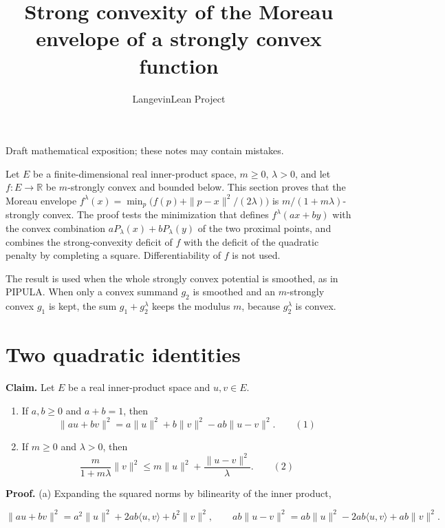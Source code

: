 \documentclass[11pt,a4paper]{article}
\title{\texorpdfstring{Strong convexity of the Moreau envelope of a strongly convex function}{Strong convexity of the Moreau envelope of a strongly convex function}}
\author{LangevinLean Project}
\date{}
\begin{document}
\maketitle
Draft mathematical exposition; these notes may contain mistakes.


Let \(E\) be a finite-dimensional real inner-product space, \(m\ge0\), \(\lambda>0\), and let \(f:E\to\mathbb R\) be \(m\)-strongly convex and bounded below. This section proves that the Moreau envelope \(f^\lambda(x)=\min_p\bigl(f(p)+\|p-x\|^2/(2\lambda)\bigr)\) is \(m/(1+m\lambda)\)-strongly convex. The proof tests the minimization that defines \(f^\lambda(ax+by)\) with the convex combination \(aP_\lambda(x)+bP_\lambda(y)\) of the two proximal points, and combines the strong-convexity deficit of \(f\) with the deficit of the quadratic penalty by completing a square. Differentiability of \(f\) is not used.




The result is used when the whole strongly convex potential is smoothed, as in PIPULA. When only a convex summand \(g_2\) is smoothed and an \(m\)-strongly convex \(g_1\) is kept, the sum \(g_1+g_2^\lambda\) keeps the modulus \(m\), because \(g_2^\lambda\) is convex.


\section{\texorpdfstring{Two quadratic identities}{Two quadratic identities}}


\textbf{Claim.} Let \(E\) be a real inner-product space and \(u,v\in E\).



\begin{enumerate}


\item If \(a,b\ge0\) and \(a+b=1\), then
\[\|au+bv\|^2=a\|u\|^2+b\|v\|^2-ab\|u-v\|^2.\qquad(1)\]

\item If \(m\ge0\) and \(\lambda>0\), then
\[\frac{m}{1+m\lambda}\|v\|^2\le m\|u\|^2+\frac{\|u-v\|^2}{\lambda}.\qquad(2)\]

\end{enumerate}



\textbf{Proof.} (a) Expanding the squared norms by bilinearity of the inner product,


\[\|au+bv\|^2=a^2\|u\|^2+2ab\langle u,v\rangle+b^2\|v\|^2,\qquad ab\|u-v\|^2=ab\|u\|^2-2ab\langle u,v\rangle+ab\|v\|^2.\]
\end{document}
